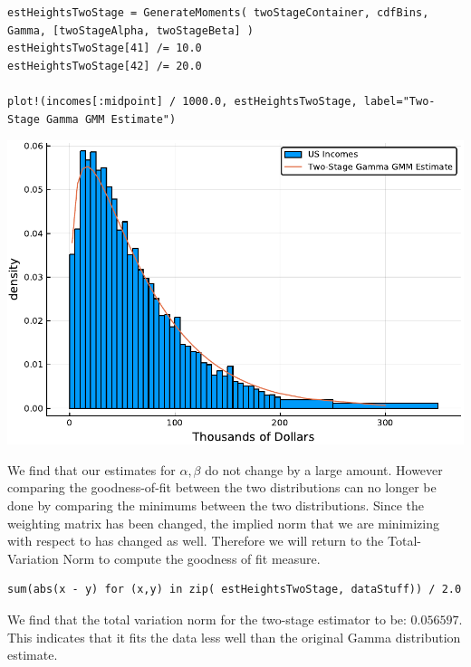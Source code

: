 \documentclass[12pt]{paper}
\begin{document}
\begin{verbatim}
estHeightsTwoStage = GenerateMoments( twoStageContainer, cdfBins, Gamma, [twoStageAlpha, twoStageBeta] )
estHeightsTwoStage[41] /= 10.0
estHeightsTwoStage[42] /= 20.0

plot!(incomes[:midpoint] / 1000.0, estHeightsTwoStage, label="Two-Stage Gamma GMM Estimate")
\end{verbatim}

\begin{centering}
  \includegraphics{twoStageLad.pdf}
\end{centering}

We find that our estimates for $\alpha,\beta$ do not change by a large
amount. However comparing the goodness-of-fit between the two
distributions can no longer be done by comparing the minimums between
the two distributions. Since the weighting matrix has been changed,
the implied norm that we are minimizing with respect to has changed as
well. Therefore we will return to the Total-Variation Norm to compute
the goodness of fit measure.

\begin{verbatim}
sum(abs(x - y) for (x,y) in zip( estHeightsTwoStage, dataStuff)) / 2.0
\end{verbatim}

We find that the total variation norm for the two-stage estimator to
be: $0.056597$. This indicates that it fits the data less well than
the original Gamma distribution estimate. 
\end{document}
